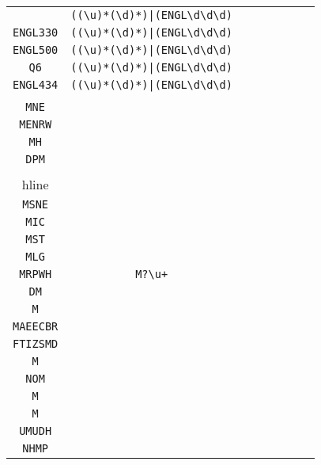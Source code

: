 \begin{longtable}{cccccccc}
\begin{tabular}{ll}
    \verb|ENGL598| & \verb.((\u)*(\d)*)|(ENGL\d\d\d).\\
\verb|ENGL330| & \verb.((\u)*(\d)*)|(ENGL\d\d\d).\\
\verb|ENGL500| & \verb.((\u)*(\d)*)|(ENGL\d\d\d).\\
\verb|Q6| & \verb.((\u)*(\d)*)|(ENGL\d\d\d).\\
\verb|ENGL434| & \verb.((\u)*(\d)*)|(ENGL\d\d\d).
\end{tabular}
\\\midrule 
\begin{tabular}{l}
    \verb|MF|\\
\verb|MNE|\\
\verb|MENRW|\\
\verb|MH|\\
\verb|DPM|\\
\\hline\\
\verb|MSNE|\\
\verb|MIC|\\
\verb|MST|\\
\verb|MLG|\\
\verb|MRPWH|
\end{tabular}

&
\verb|M?\u+|
&

\begin{tabular}{l}
    \verb|(\u)*M(\u)*|\\
\verb|DM|\\
\verb|M|\\
\verb|MAEECBR|\\
\verb|FTIZSMD|\\
\verb|M|
\end{tabular}

&

\begin{tabular}{l}
    \verb|(\u)*M(\u)*|\\
\verb|NOM|\\
\verb|M|\\
\verb|M|\\
\verb|UMUDH|\\
\verb|NHMP|
\end{tabular}

&


\end{longtable}
